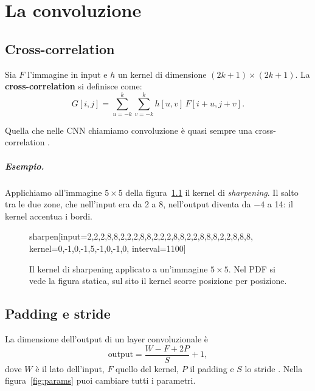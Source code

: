 \chapter{La convoluzione}\label{ch:conv}
\section{Cross-correlation}
Sia $F$ l'immagine in input e $h$ un kernel di dimensione $(2k+1) \times (2k+1)$. La \textbf{cross-correlation} si definisce come:
\[
G[i, j] = \sum_{u=-k}^{k}\sum_{v=-k}^{k} h[u, v]\, F[i + u, j + v].
\]

\begin{osservazione}
Quella che nelle CNN chiamiamo convoluzione è quasi sempre una cross-correlation \cite[cap.~9]{Goodfellow-et-al-2016}.
\end{osservazione}

\paragraph{Esempio.}
Applichiamo all'immagine $5 \times 5$ della figura~\ref{fig:sharpen} il kernel di \emph{sharpening}. Il salto tra le due zone, che nell'input era da 2 a 8, nell'output diventa da $-4$ a 14: il kernel accentua i bordi.

\begin{figure}[htbp]
\centering
\begin{widget}{sharpen}[input={{2,2,2,8,8},{2,2,2,8,8},{2,2,2,8,8},{2,2,8,8,8},{2,2,8,8,8}}, kernel={{0,-1,0},{-1,5,-1},{0,-1,0}}, interval=1100]
\end{widget}
\caption{Il kernel di sharpening applicato a un'immagine $5 \times 5$. Nel PDF si vede la figura statica, sul sito il kernel scorre posizione per posizione.}
\label{fig:sharpen}
\end{figure}

\section{Padding e stride}
La dimensione dell'output di un layer convoluzionale è
\[
\text{output} = \frac{W - F + 2P}{S} + 1,
\]
dove $W$ è il lato dell'input, $F$ quello del kernel, $P$ il padding e $S$ lo stride \cite{Dumoulin2016}. Nella figura~\ref{fig:params} puoi cambiare tutti i parametri.

